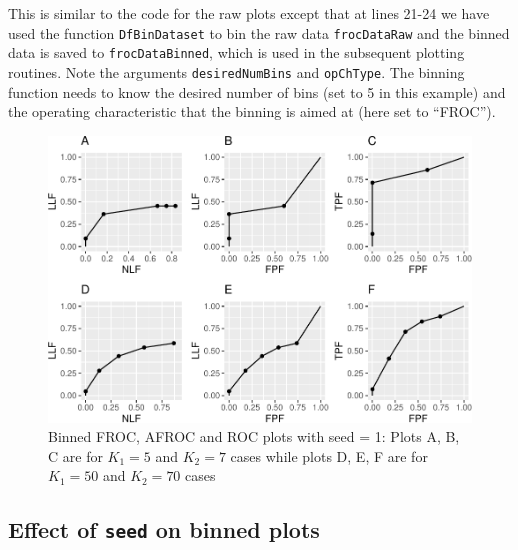 \documentclass[
]{book}
\newenvironment{Shaded}{\begin{snugshade}}{\end{snugshade}}
\newcommand{\DataTypeTok}[1]{\textcolor[rgb]{0.13,0.29,0.53}{#1}}
\newcommand{\DecValTok}[1]{\textcolor[rgb]{0.00,0.00,0.81}{#1}}
\newcommand{\KeywordTok}[1]{\textcolor[rgb]{0.13,0.29,0.53}{\textbf{#1}}}
\newcommand{\NormalTok}[1]{#1}
\newcommand{\OperatorTok}[1]{\textcolor[rgb]{0.81,0.36,0.00}{\textbf{#1}}}
\newcommand{\StringTok}[1]{\textcolor[rgb]{0.31,0.60,0.02}{#1}}
\begin{document}
\begin{Shaded}
\end{Shaded}

This is similar to the code for the raw plots except that at lines 21-24 we have used the function \texttt{DfBinDataset} to bin the raw data \texttt{frocDataRaw} and the binned data is saved to \texttt{frocDataBinned}, which is used in the subsequent plotting routines. Note the arguments \texttt{desiredNumBins} and \texttt{opChType}. The binning function needs to know the desired number of bins (set to 5 in this example) and the operating characteristic that the binning is aimed at (here set to ``FROC'').

\begin{figure}
\centering
\includegraphics{13b-froc-empirical2_files/figure-latex/froc-afroc-roc-binned-seed1-1.pdf}
\caption{\label{fig:froc-afroc-roc-binned-seed1}Binned FROC, AFROC and ROC plots with seed = 1: Plots A, B, C are for \(K_1 = 5\) and \(K_2 = 7\) cases while plots D, E, F are for \(K_1 = 50\) and \(K_2 = 70\) cases}
\end{figure}

\hypertarget{effect-of-seed-on-binned-plots}{%
\subsection{\texorpdfstring{Effect of \texttt{seed} on binned plots}{Effect of seed on binned plots}}\label{effect-of-seed-on-binned-plots}}
\end{document}
